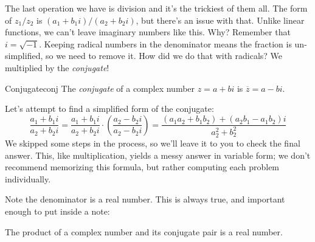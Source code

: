 \documentclass[lang=en,11pt]{elegantbook}
\begin{document}
The last operation we have is division and it's the trickiest of them all.  The form of $z_1/z_2$ is $\left(a_1+b_1i\right)/\left(a_2+b_2i\right)$, but there's an issue with that.  Unlike linear functions, we can't leave imaginary numbers like this.  Why?  Remember that $i=\sqrt{-1}$.  Keeping radical numbers in the denominator means the fraction is un-simplified, so we need to remove it.  How did we do that with radicals?  We multiplied by the \textit{conjugate}!
\begin{definition}{Conjugate}{conj}
The \textit{conjugate} of a complex number $z=a+bi$ is $\overline{z}=a-bi$.  
\end{definition}
\noindent Let's attempt to find a simplified form of the conjugate: $$\frac{a_1+b_1i}{a_2+b_2i}=\frac{a_1+b_1i}{a_2+b_2i}\cdot \left(\frac{a_2-b_2i}{a_2-b_2i}\right)=\frac{\left(a_1a_2+b_1b_2\right)+\left(a_2b_1-a_1b_2\right)i}{a_2^2+b_2^2}$$
We skipped some steps in the process, so we'll leave it to you to check the final answer.  This, like multiplication, yields a messy answer in variable form; we don't recommend memorizing this formula, but rather computing each problem individually.

Note the denominator is a real number.  This is always true, and important enough to put inside a note:
\begin{note}
The product of a complex number and its conjugate pair is a real number.
\end{note}
\end{document}
